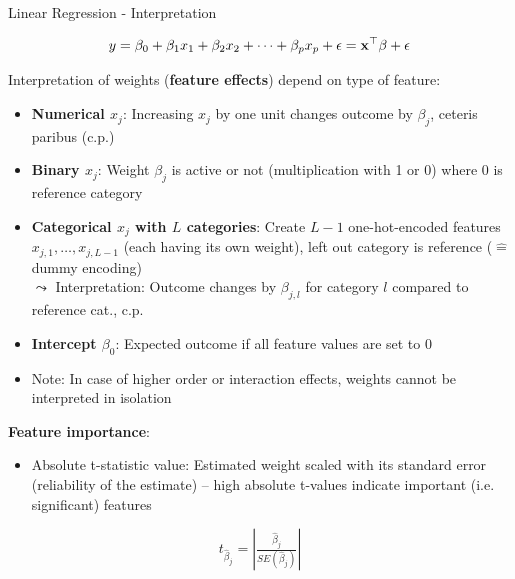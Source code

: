 \documentclass[11pt,compress,t,notes=noshow, aspectratio=169, xcolor=table]{beamer}
\begin{document}
\begin{frame}[c]{Linear Regression - Interpretation}

$$y = \beta_0 + \beta_1 x_1 + \beta_2 x_2 + \dots + \beta_p x_p + \epsilon = \xv^\top \beta + \epsilon$$

    Interpretation of weights (\textbf{feature effects}) depend on type of feature:
    \begin{itemize}
        \item \textbf{Numerical $x_j$}: Increasing $x_j$ by one unit changes outcome by $\beta_j$, ceteris paribus (c.p.)
        \pause
        \item \textbf{Binary $x_j$}: Weight $\beta_j$ is active or not (multiplication with 1 or 0) where 0 is reference category
        \pause
        \item %
        \textbf{Categorical $x_j$ with $L$ categories}: Create $L-1$ one-hot-encoded features $x_{j,1}, \hdots, x_{j,L-1}$ (each having its own weight), left out category is reference ($\hat =$ dummy encoding)
        \\
        $\leadsto$ Interpretation:
        Outcome changes by $\beta_{j,l}$ for category $l$ compared to reference cat.,  c.p.\pause
        \item \textbf{Intercept $\beta_0$}: Expected outcome if all feature values are set to 0 %
        \item Note: In case of higher order or interaction effects, weights cannot be interpreted in isolation
    \end{itemize}	
    \pause
    \textbf{Feature importance}:
    \begin{itemize}
        \item Absolute t-statistic value: Estimated weight scaled with its standard error (reliability of the estimate) -- high absolute t-values indicate important (i.e. significant) features
    \end{itemize}
    $$t_{\hat\beta_j} = \left| \tfrac{\hat\beta_j}{SE(\hat\beta_j)} \right|$$
\end{frame}
\end{document}
